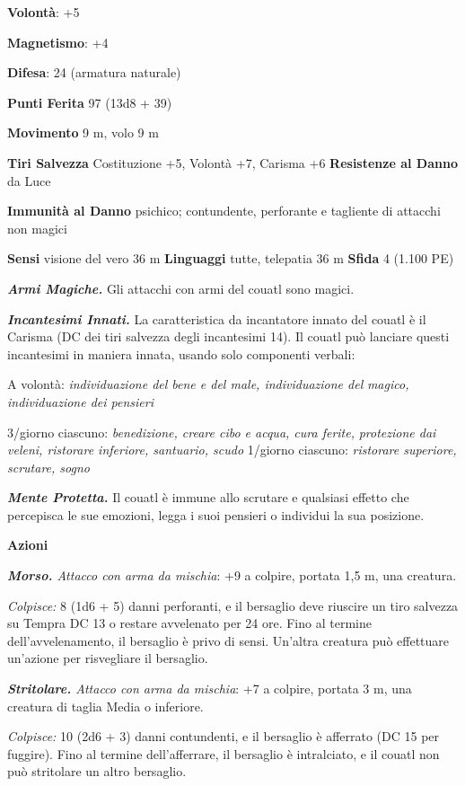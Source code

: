 \begin{multicols}{2}
\textbf{Volontà}: +5

\textbf{Magnetismo}: +4

\textbf{Difesa}: 24 (armatura naturale)

\textbf{Punti Ferita} 97 (13d8 + 39)

\textbf{Movimento} 9 m, volo 9 m

\textbf{Tiri Salvezza} Costituzione +5, Volontà +7, Carisma +6
\textbf{Resistenze al Danno} da Luce

\textbf{Immunità al Danno} psichico; contundente, perforante e tagliente
di attacchi non magici

\textbf{Sensi} visione del vero 36 m
\textbf{Linguaggi} tutte, telepatia 36 m \textbf{Sfida} 4 (1.100 PE)

\emph{\textbf{Armi Magiche.}} Gli attacchi con armi del couatl sono
magici.

\emph{\textbf{Incantesimi Innati.}} La caratteristica da incantatore
innato del couatl è il Carisma (DC dei tiri salvezza degli incantesimi
14). Il couatl può lanciare questi incantesimi in maniera innata, usando
solo componenti verbali:

A volontà: \emph{individuazione del bene e del male, individuazione del}
\emph{magico, individuazione dei pensieri}

3/giorno ciascuno: \emph{benedizione, creare cibo e acqua, cura ferite,}
\emph{protezione dai veleni, ristorare inferiore, santuario, scudo}
1/giorno ciascuno: \emph{ristorare superiore, scrutare, sogno}

\emph{\textbf{Mente Protetta.}} Il couatl è immune allo scrutare e
qualsiasi effetto che percepisca le sue emozioni, legga i suoi pensieri
o individui la sua posizione.

\textbf{Azioni}

\emph{\textbf{Morso.} Attacco con arma da mischia}: +9 a colpire,
portata 1,5 m, una creatura.

\emph{Colpisce:} 8 (1d6 + 5) danni perforanti, e il bersaglio deve
riuscire un tiro salvezza su Tempra DC 13 o restare avvelenato per
24 ore. Fino al termine dell'avvelenamento, il bersaglio è privo di
sensi. Un'altra creatura può effettuare un'azione per risvegliare il
bersaglio.

\emph{\textbf{Stritolare.} Attacco con arma da mischia}: +7 a colpire,
portata 3 m, una creatura di taglia Media o inferiore.

\emph{Colpisce:} 10 (2d6 + 3) danni contundenti, e il bersaglio è
afferrato (DC 15 per fuggire). Fino al termine dell'afferrare, il
bersaglio è intralciato, e il couatl non può stritolare un altro
bersaglio.


\end{multicols}
